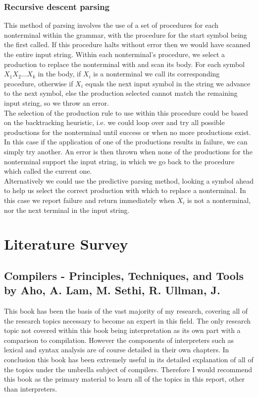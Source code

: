 \documentclass[a4paper, 11pt]{article}
\begin{document}
\subsubsection{Recursive descent parsing}
This method of parsing involves the use of a set of procedures for each nonterminal within the grammar, with the procedure for the start symbol being the first called. If this procedure halts without error then we would have scanned the entire input string. Within each nonterminal's procedure, we select a production to replace the nonterminal with and scan its body. For each symbol $X_1X_2...X_k$ in the body, if $X_i$ is a nonterminal we call its corresponding procedure, otherwise if $X_i$ equals the next input symbol in the string we advance to the next symbol, else the production selected cannot match the remaining input string, so we throw an error.
\\\newline
The selection of the production rule to use within this procedure could be based on the backtracking heuristic, i.e. we could loop over and try all possible productions for the nonterminal until success or when no more productions exist. In this case if the application of one of the productions results in failure, we can simply try another. An error is then thrown when none of the productions for the nonterminal support the input string, in which we go back to the procedure which called the current one.
\\\newline
Alternatively we could use the predictive parsing method, looking a symbol ahead to help us select the correct production with which to replace a nonterminal. In this case we report failure and return immediately when $X_i$ is not a nonterminal, nor the next terminal in the input string.

\section{Literature Survey}
\subsection{Compilers - Principles, Techniques, and Tools by Aho, A. Lam, M. Sethi, R. Ullman, J.}
This book has been the basis of the vast majority of my research, covering all of the research topics necessary to become an expert in this field. The only research topic not covered within this book being interpretation as its own part with a comparison to compilation. However the components of interpreters such as lexical and syntax analysis are of course detailed in their own chapters. In conclusion this book has been extremely useful in its detailed explanation of all of the topics under the umbrella subject of compilers. Therefore I would recommend this book as the primary material to learn all of the topics in this report, other than interpreters.
\end{document}

